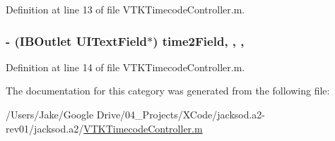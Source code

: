 Definition at line 13 of file V\+T\+K\+Timecode\+Controller.\+m.

\hypertarget{category_v_t_k_timecode_controller_07_08_a91d07bcd511c8dead712ccbda0ef0ba1}{
\subsubsection[{time2\+Field}]{\setlength{\rightskip}{0pt plus 5cm}-\/ (I\+B\+Outlet U\+I\+Text\+Field$\ast$) time2\+Field\hspace{0.3cm}{\ttfamily [read]}, {\ttfamily [write]}, {\ttfamily [nonatomic]}, {\ttfamily [weak]}}}\label{category_v_t_k_timecode_controller_07_08_a91d07bcd511c8dead712ccbda0ef0ba1}


Definition at line 14 of file V\+T\+K\+Timecode\+Controller.\+m.



The documentation for this category was generated from the following file\+:\begin{DoxyCompactItemize}
\item 
/\+Users/\+Jake/\+Google Drive/04\+\_\+\+Projects/\+X\+Code/jacksod.\+a2-\/rev01/jacksod.\+a2/\hyperlink{_v_t_k_timecode_controller_8m}{V\+T\+K\+Timecode\+Controller.\+m}\end{DoxyCompactItemize}
